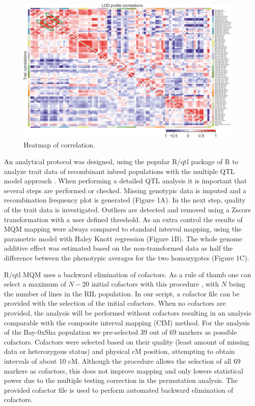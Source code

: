 \begin{figure}[h!]
  \centering
  \includegraphics[keepaspectratio,scale=0.30]{eps/image_3_1_3.eps}
  \caption[Heatmap of correlation.]
    {Heatmap of correlation.}
\end{figure}

An analytical protocol was designed, using the popular R/qtl package of R to analyze trait data of 
recombinant inbred populations with the multiple QTL model approach \cite{Arends:2010}. When 
performing a detailed QTL analysis it is important that several steps are performed or checked. 
Missing genotypic data is imputed and a recombination frequency plot is generated (Figure 1A). In 
the next step, quality of the trait data is investigated. Outliers are detected and removed using 
a Zscore transformation with a user defined threshold. As an extra control the results of MQM mapping 
were always compared to standard interval mapping, using the parametric model with Haley Knott 
regression \cite{Haley:1992} (Figure 1B). The whole genome additive effect was estimated based 
on the non-transformed data as half the difference between the phenotypic averages for the two 
homozygotes (Figure 1C).

R/qtl MQM uses a backward elimination of cofactors. As a rule of thumb one can select a maximum of 
$N-20$ initial cofactors with this procedure \cite{Handbook:Jansen:2007}, with $N$ being the number of lines in 
the RIL population. In our script, a cofactor file can be provided with the selection of the initial 
cofactors. When no cofactors are provided, the analysis will be performed without cofactors resulting 
in an analysis comparable with the composite interval mapping (CIM) method. For the analysis of the 
Bay-0xSha population we pre-selected 39 out of 69 markers as possible cofactors. Cofactors were selected 
based on their quality (least amount of missing data or heterozygous status) and physical cM position, 
attempting to obtain intervals of about 10 cM. Although the procedure allows the selection of all 69 
markers as cofactors, this does not improve mapping and only lowers statistical power due to the 
multiple testing correction in the permutation analysis. The provided cofactor file is used to perform 
automated backward elimination of cofactors.

